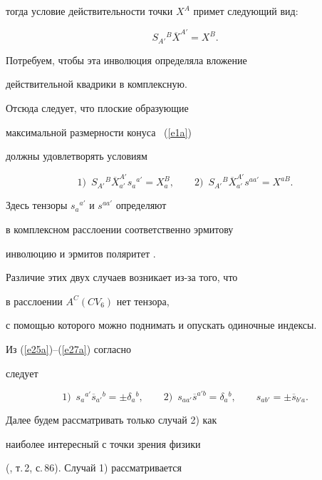 тогда условие действительности точки $X^A$ примет следующий вид:


\begin{equation}


\label{e26a}


S_{A'}{}^B\overline X^{A'}=X^B.


\end{equation}


Потребуем, чтобы эта инволюция определяла вложение


действительной квадрики в комплексную.


Отсюда следует, что плоские образующие


максимальной размерности конуса ~(\ref{e1a})


должны удовлетворять условиям


\begin{equation}


\label{e27a}


1)\ \; S_{A'}{}^B\overline X_{a'}^{A'}s_a{}^{a'}=X_a^B,\qquad


2)\ \; S_{A'}{}^B\overline X_{a'}^{A'}s^{aa'}=X^{aB}.


\end{equation}


Здесь тензоры $s_a{}^{a'}$ и $s^{aa'}$ определяют


в комплексном расслоении соответственно эрмитову


инволюцию и эрмитов поляритет \cite{8}.


Различие этих двух случаев возникает из-за того, что


в расслоении $A^C(CV_6)$ нет тензора,


с помощью которого можно поднимать и опускать одиночные индексы.


Из (\ref{e25a})--(\ref{e27a}) согласно \cite{8}


следует


$$




1)\ \; s_a{}^{a'}\overline s_{a'}{}^b=\pm\delta_a{}^b,\qquad


2)\ \; s_{aa'}\overline s^{a'b}=\delta_a{}^b,\qquad


s_{ab'}=\pm\overline s_{b'a}.


$$


Далее будем рассматривать только случай 2) как


наиболее интересный с точки зрения физики


(\cite{2}, т.\,2, с.\,86). Случай 1) рассматривается


